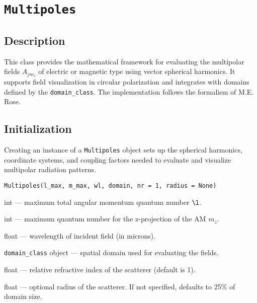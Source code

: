 \section{\texttt{Multipoles}}

\subsection{Description}
This class provides the mathematical framework for evaluating the multipolar fields \( A_{j m_z} \) of electric or magnetic type using vector spherical harmonics. It supports field visualization in circular polarization and integrates with domains defined by the \texttt{domain\_class}. The implementation follows the formalism of M.E. Rose\cite{rose}.

\subsection{Initialization}
Creating an instance of a \texttt{Multipoles} object sets up the spherical harmonics, coordinate systems, and coupling factors needed to evaluate and visualize multipolar radiation patterns.

\begin{verbatim}
Multipoles(l_max, m_max, wl, domain, nr = 1, radius = None)
\end{verbatim}

\begin{description}[leftmargin=3cm]
    \item[l\_max:] int — maximum total angular momentum quantum number $\l$.
    \item[m\_max:] int — maximum quantum number for the z-projection of the AM $m_z$.
    \item[wl:] float — wavelength of incident field (in microns).
    \item[domain:] \texttt{domain\_class} object — spatial domain used for evaluating the fields.
    \item[nr:] float — relative refractive index of the scatterer (default is 1).
    \item[radius:] float — optional radius of the scatterer. If not specified, defaults to 25\% of domain size.
\end{description}

